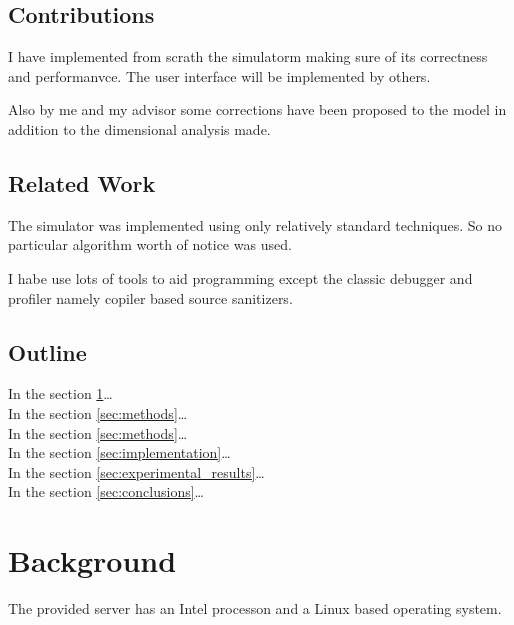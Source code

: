 \documentclass[draft]{article}
\begin{document}
\subsection{Contributions}\label{sec:contrib}

I have implemented from scrath the simulatorm making sure of its correctness and
performanvce. The user interface will be implemented by others.

Also by me and my advisor some corrections have been proposed to the model in
addition to the dimensional analysis made.

\subsection{Related Work}\label{sec:related_work}


The simulator was implemented using only relatively standard techniques. So no
particular algorithm worth of notice was used.

I habe use lots of tools to aid programming except the classic debugger and
profiler namely copiler based source sanitizers.

\subsection{Outline}\label{sec:outline}

In the section \ref{sec:background}\dots\\
In the section \ref{sec:methods}\dots\\
In the section \ref{sec:methods}\dots\\
In the section \ref{sec:implementation}\dots\\
In the section \ref{sec:experimental_results}\dots\\
In the section \ref{sec:conclusions}\dots\\

\section{Background}\label{sec:background}

The provided server has an Intel processon and a Linux based operating system.
\end{document}
